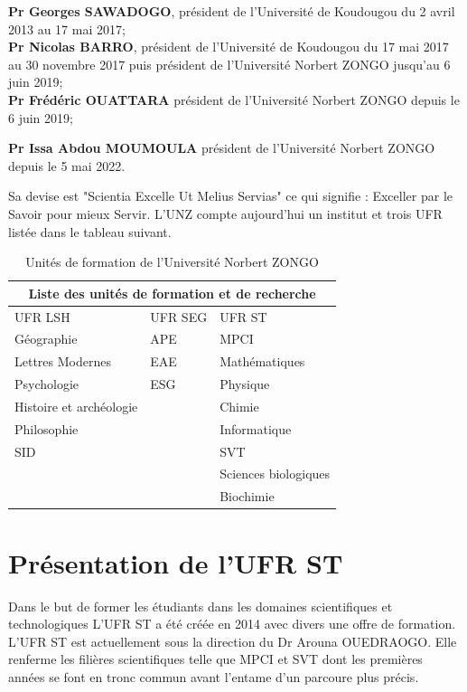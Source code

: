 \textbf{Pr Georges SAWADOGO}, président de l’Université de Koudougou du 2 avril 2013 au 17 mai 2017;\\

\textbf{Pr Nicolas BARRO}, président de l’Université de Koudougou du 17 mai 2017 au 30 novembre 2017 puis président de l’Université Norbert ZONGO jusqu’au 6 juin 2019;\\

\textbf{Pr Frédéric OUATTARA} président de l’Université Norbert ZONGO depuis le 6 juin 2019;

\textbf{Pr Issa Abdou MOUMOULA} président de l’Université Norbert ZONGO depuis le 5 mai 2022. \par
Sa devise est "Scientia Excelle Ut Melius Servias" ce qui signifie : Exceller par le Savoir pour mieux Servir.
L’UNZ compte aujourd’hui un institut et trois UFR listée dans le tableau suivant.
\begin{table}[h]
  \begin{tabular}{ |p{5cm}|p{5cm}|p{5cm}| }
\hline
\multicolumn{3}{|c|}{Liste des unités de formation et de recherche} \\
\hline
UFR LSH & UFR SEG & UFR ST \\
\hline
Géographie & APE & MPCI\\
Lettres Modernes & EAE & Mathématiques \\
Psychologie & ESG & Physique  \\
Histoire et archéologie &   & Chimie  \\
Philosophie &   & Informatique  \\
SID &   &  SVT \\
    &   &  Sciences biologiques \\
    &   &  Biochimie \\
\hline
\end{tabular}

  \caption{Unités de formation de l'Université Norbert ZONGO}
  \label{tab:montableau1}
\end{table}

\section{Présentation de l’UFR ST}
Dans le but de former les étudiants dans les domaines scientifiques et technologiques L’UFR ST a été créée en 2014 avec divers une offre de formation.
L’UFR ST est actuellement sous la direction du Dr Arouna OUEDRAOGO. Elle  renferme les filières scientifiques telle que MPCI et SVT dont les premières années se font en tronc commun avant l’entame d’un parcoure plus précis. 

